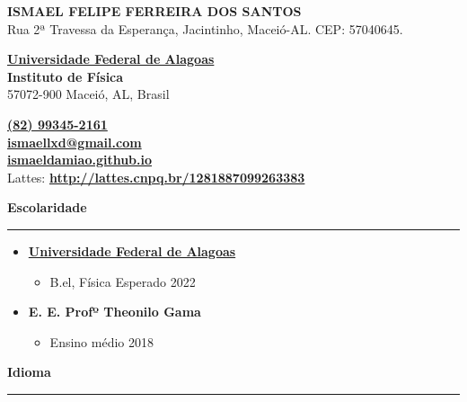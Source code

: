 \documentclass[
   12pt,                         %
   a4paper,                      %
   spanish,                      %
   brazil,                       %
   xcolor=table                  %
]{abntex2}
\newcommand{\customtitle}[1]{\noindent\textbf{\large#1}\vspace{2pt}\hrule}
\begin{document}

   \begin{center}
      \textbf{ISMAEL FELIPE FERREIRA DOS SANTOS}\\
      \tiny
      Rua 2ª Travessa da Esperança, Jacintinho, Maceió-AL. CEP: 57040645.
   \end{center}

   \begin{multicols}{2}
      \tiny
      \textbf{\href{https://ufal.br/}{Universidade Federal de Alagoas}}\\
      \textbf{Instituto de Física}\\
      57072-900 Macei\'o, AL, Brasil

      \columnbreak

        \textbf{\href{tel:+5582993452161}{(82) 99345-2161}}\\
       \textbf{\href{mailto:ismaellxd@gmail.com}{ismaellxd@gmail.com}}\\
       \textbf{\href{https://ismaeldamiao.github.io/pt/}{ismaeldamiao.github.io}} \\
      Lattes: \textbf{\href{http://lattes.cnpq.br/1281887099263383}{http://lattes.cnpq.br/1281887099263383}}
   \end{multicols}


\customtitle{Escolaridade}

   \begin{itemize}[nosep]

      \item[ ] \textbf{\href{https://ufal.br/}{Universidade Federal de Alagoas}}
      \begin{itemize}[nosep]
        \item[ ] B.el, Física \hfill Esperado 2022
      \end{itemize}


      \item[ ] \textbf{E. E. Profº Theonilo Gama}
      \begin{itemize}[nosep]
        \item[ ] Ensino médio \hfill 2018
      \end{itemize}

   \end{itemize}

\customtitle{Idioma}
\end{document}
